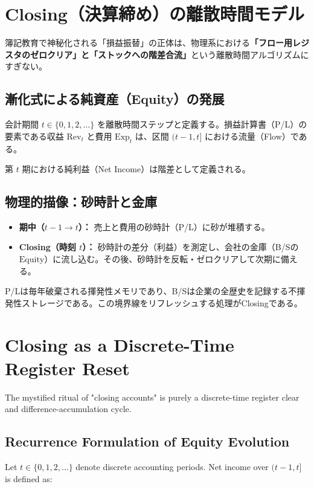 \ifja
\chapter{Closing（決算締め）の離散時間モデル}
\label{chap:closing_model}

簿記教育で神秘化される「損益振替」の正体は、物理系における\textbf{「フロー用レジスタのゼロクリア」と「ストックへの階差合流」}という離散時間アルゴリズムにすぎない。

\section{漸化式による純資産（Equity）の発展}
会計期間 $t \in \{0, 1, 2, \dots\}$ を離散時間ステップと定義する。損益計算書（P/L）の要素である収益 $\text{Rev}_t$ と費用 $\text{Exp}_t$ は、区間 $(t-1, t]$ における流量（Flow）である。

第 $t$ 期における純利益（Net Income）は階差として定義される。


\section{物理的描像：砂時計と金庫}
\begin{itemize}
    \item \textbf{期中（$t-1 \to t$）：} 売上と費用の砂時計（P/L）に砂が堆積する。
    \item \textbf{Closing（時刻 $t$）：} 砂時計の差分（利益）を測定し、会社の金庫（B/Sの $\text{Equity}$）に流し込む。その後、砂時計を反転・ゼロクリアして次期に備える。
\end{itemize}

P/Lは毎年破棄される揮発性メモリであり、B/Sは企業の全歴史を記録する不揮発性ストレージである。この境界線をリフレッシュする処理がClosingである。

\else
\chapter{Closing as a Discrete-Time Register Reset}
\label{chap:closing_model}

The mystified ritual of "closing accounts" is purely a discrete-time register clear and difference-accumulation cycle.

\section{Recurrence Formulation of Equity Evolution}
Let $t \in \{0, 1, 2, \dots\}$ denote discrete accounting periods. Net income over $(t-1, t]$ is defined as:


